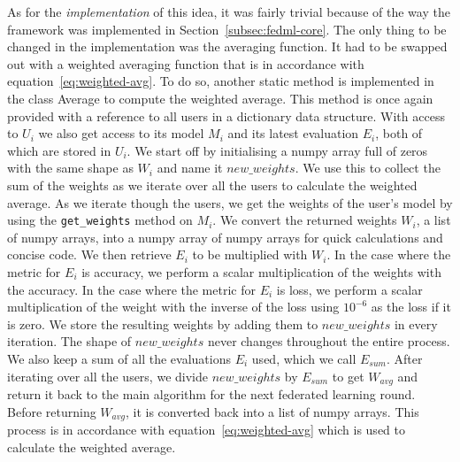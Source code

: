 \documentclass[12pt]{article}
\begin{document}
As for the \textit{implementation} of this idea, it was fairly trivial because of the way the framework was implemented in Section~\ref{subsec:fedml-core}. The only thing to be changed in the implementation was the averaging function. It had to be swapped out with a weighted averaging function that is in accordance with equation~\ref{eq:weighted-avg}. To do so, another static method is implemented in the class Average to compute the weighted average. This method is once again provided with a reference to all users in a dictionary data structure. With access to $U_i$ we also get access to its model $M_i$ and its latest evaluation $E_i$, both of which are stored in $U_i$. We start off by initialising a numpy array full of zeros with the same shape as $W_i$ and name it $new\_weights$. We use this to collect the sum of the weights as we iterate over all the users to calculate the weighted average. As we iterate though the users, we get the weights of the user's model by using the \texttt{get\_weights} method on $M_i$. We convert the returned weights $W_i$, a list of numpy arrays, into a numpy array of numpy arrays for quick calculations and concise code. We then retrieve $E_i$ to be multiplied with $W_i$. In the case where the metric for $E_i$ is accuracy, we perform a scalar multiplication of the weights with the accuracy. In the case where the metric for $E_i$ is loss, we perform a scalar multiplication of the weight with the inverse of the loss using $10^{-6}$ as the loss if it is zero. We store the resulting weights by adding them to $new\_weights$ in every iteration. The shape of $new\_weights$ never changes throughout the entire process. We also keep a sum of all the evaluations $E_i$ used, which we call $E_{sum}$. After iterating over all the users, we divide $new\_weights$ by $E_{sum}$ to get $W_{avg}$ and return it back to the main algorithm for the next federated learning round. Before returning $W_{avg}$, it is converted back into a list of numpy arrays. This process is in accordance with equation~\ref{eq:weighted-avg} which is used to calculate the weighted average.
\end{document}
